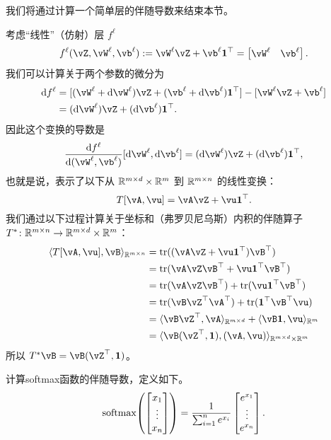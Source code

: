\documentclass[../../book-main.tex]{subfiles}
\begin{document}
我们将通过计算一个简单层的伴随导数来结束本节。
\begin{example}
    考虑“线性”（仿射）层 \(f^{\ell}\)
    \begin{equation}
        f^{\ell}(\vZ, \vW^{\ell}, \vb^{\ell}) := \vW^{\ell}\vZ + \vb^{\ell}\vone^{\top} = \mat{\vW^{\ell} & \vb^{\ell}}.
    \end{equation}
    我们可以计算关于两个参数的微分为
    \begin{align}
        \odif{f}^{\ell}
        &= [(\vW^{\ell} + \odif{\vW}^{\ell})\vZ + (\vb^{\ell} + \odif{\vb}^{\ell})\vone^{\top}] - [\vW^{\ell}\vZ + \vb^{\ell}] \\ 
        &= (\odif{\vW}^{\ell})\vZ + (\odif{\vb}^{\ell})\vone^{\top}.
    \end{align}
    因此这个变换的导数是
    \begin{equation}
        \odv{f^{\ell}}{(\vW^{\ell}, \vb^{\ell})}[\odif{\vW}^{\ell}, \odif{\vb}^{\ell}] = (\odif{\vW}^{\ell})\vZ + (\odif{\vb}^{\ell})\vone^{\top},
    \end{equation}
    也就是说，表示了以下从 \(\mathbb{R}^{m \times d} \times \mathbb{R}^{m}\) 到 \(\mathbb{R}^{m \times n}\) 的线性变换：
    \begin{equation}
        T[\vA, \vu] = \vA\vZ + \vu\vone^{\top}.
    \end{equation}
    我们通过以下过程计算关于坐标和（弗罗贝尼乌斯）内积的伴随算子 \(T^{*} \colon \mathbb{R}^{m \times n} \to \mathbb{R}^{m \times d} \times \mathbb{R}^{m}\)：
    \begin{align}
        \ip{T[\vA, \vu]}{\vB}_{\R^{m \times n}} 
        &= \tr((\vA\vZ + \vu\vone^{\top})\vB^{\top}) \\
        &= \tr(\vA\vZ\vB^{\top} + \vu\vone^{\top}\vB^{\top}) \\
        &= \tr(\vA\vZ\vB^{\top}) + \tr(\vu\vone^{\top}\vB^{\top}) \\
        &= \tr(\vB\vZ^{\top}\vA^{\top}) + \tr(\vone^{\top}\vB^{\top}\vu) \\
        &= \ip{\vB\vZ^{\top}}{\vA}_{\R^{m \times d}} + \ip{\vB\vone}{\vu}_{\R^{m}} \\
        &= \ip{\vB(\vZ^{\top}, \vone)}{(\vA, \vu)}_{\R^{m \times d} \times \R^{m}}
    \end{align}
    所以 \(T^{*}\vB = \vB(\vZ^{\top}, \vone)\)。
\end{example}

\begin{example}
    计算softmax函数的伴随导数，定义如下。
    \begin{equation}
        \softmax\rp{\mat{x_{1} \\ \vdots \\ x_{n}}} = \frac{1}{\sum_{i = 1}^{n}e^{x_{i}}}\mat{e^{x_{1}} \\ \vdots \\ e^{x_{n}}}.
    \end{equation}
\end{example}
\end{document}
